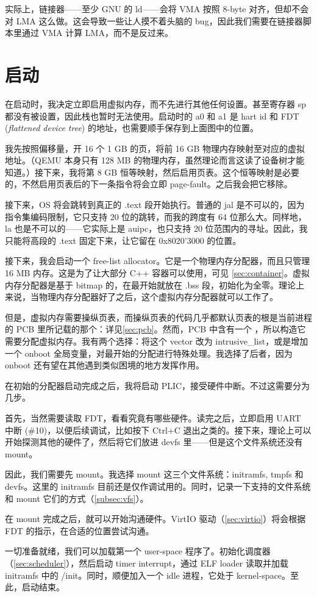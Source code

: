实际上，链接器——至少 GNU 的 ld——会将 VMA 按照 8-byte 对齐，但却不会对 LMA 这么做。这会导致一些让人摸不着头脑的 bug，因此我们需要在链接器脚本里通过 VMA 计算 LMA，而不是反过来。

\section{启动}
\label{sec:boot}

在启动时，我决定立即启用虚拟内存，而不先进行其他任何设置。甚至寄存器 sp 都没有被设置，因此栈也暂时无法使用。启动时的 a0 和 a1 是 hart id 和 FDT (\textit{flattened device tree}) 的地址，也需要顺手保存到上面图中的位置。

我先按照偏移量，开 16 个 1 GB 的页，将前 16 GB 物理内存映射至对应的虚拟地址。（QEMU 本身只有 128 MB 的物理内存，虽然理论而言这读了设备树才能知道。）接下来，我将第 8 GB 恒等映射，然后启用页表。这个恒等映射是必要的，不然启用页表后的下一条指令将会立即 page-fault。之后我会把它移除。

接下来，OS 将会跳转到真正的 .text 段开始执行。普通的 jal 是不可以的，因为指令集编码限制，它只支持 20 位的跳转，而我的跨度有 64 位那么大。同样地，la 也是不可以的——它实际上是 auipc，也只支持 20 位范围内的寻址。因此，我只能将高段的 .text 固定下来，让它留在 0x8020'3000 的位置。

接下来，我会启动一个 free-list allocator。它是一个物理内存分配器，而且只管理 16 MB 内存。这是为了让大部分 C++ 容器可以使用，可见 \cref{sec:container}。虚拟内存分配器是基于 bitmap 的，在最开始就放在 .bss 段，初始化为全零。理论上来说，当物理内存分配器好了之后，这个虚拟内存分配器就可以工作了。

但是，虚拟内存需要操纵页表，而操纵页表的代码几乎都默认页表的根是当前进程的 PCB 里所记载的那个：详见\cref{sec:pcb}。然而，PCB 中含有一个 ，所以构造它需要分配虚拟内存。我有两个选择：将这个 vector 改为 intrusive\_list，或是增加一个 onboot 全局变量，对最开始的分配进行特殊处理。我选择了后者，因为 onboot 还有望在其他遇到类似困境的地方发挥作用。

在初始的分配器启动完成之后，我将启动 PLIC，接受硬件中断。不过这需要分为几步。

首先，当然需要读取 FDT，看看究竟有哪些硬件。读完之后，立即启用 UART 中断 (\#10)，以便后续调试，比如按下 Ctrl+C 退出之类的。接下来，理论上可以开始探测其他的硬件了，然后将它们放进 devfs 里——但是这个文件系统还没有 mount。

因此，我们需要先 mount。我选择 mount 这三个文件系统：initramfs, tmpfs 和 devfs。这里的 initramfs 目前还是仅作调试用的。同时，记录一下支持的文件系统和 mount 它们的方式（\cref{subsec:vfs}）。

在 mount 完成之后，就可以开始沟通硬件。VirtIO 驱动（\cref{sec:virtio}）将会根据 FDT 的指示，在合适的位置尝试沟通。

一切准备就绪，我们可以加载第一个 user-space 程序了。初始化调度器（\cref{sec:scheduler}），然后启动 timer interrupt，通过 ELF loader 读取并加载 initramfs 中的 /init。同时，顺便加入一个 idle 进程，它处于 kernel-space。至此，启动结束。
